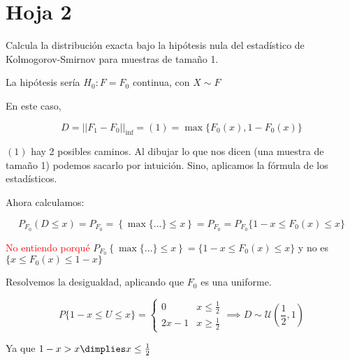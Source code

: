 \section{Hoja 2}


\begin{problem}[1] Calcula la distribución exacta bajo la hipótesis nula del estadístico de Kolmogorov-Smirnov para muestras de tamaño 1.

\solution



La hipótesis sería $H_0 : F = F_0$ continua, con $X \sim F$

En este caso,

\[D=||F_1 - F_0||_{\inf} = (1) = \max\{F_0(x), 1 - F_0(x)\}\]

$(1)$ hay 2 posibles caminos. Al dibujar lo que nos dicen (una muestra de tamaño 1) podemos sacarlo por intuición. Sino, aplicamos la fórmula de los estadísticos.

Ahora calculamos:

\[ P_{F_0}(D\leq x) = P_{F_0} = \left\{\max \{ ... \}\leq x\right\} = P_{F_0} = P_{F_0}\{ 1-x \leq F_0(x) \leq x \}\]

\textcolor{red}{No entiendo porqué } $P_{F_0} \left\{\max \{ ... \}\leq x\right\} = \{ 1-x \leq F_0(x) \leq x \}$ y no es $\{ x \leq F_0(x) \leq 1-x \}$

Resolvemos la desigualdad, aplicando que $F_0$ es una uniforme.

\[
P\{1-x \leq U \leq x\} = \left\{ \begin{array}{cc} 0 & x\leq \frac{1}{2} \\ 2x-1 & x\geq \frac{1}{2}\end{array} \right. \implies D \sim \mathcal{U}\left(\frac{1}{2},1\right)
\]

Ya que $1-x > x \dimplies x\le \frac{1}{2}$

\end{problem}
